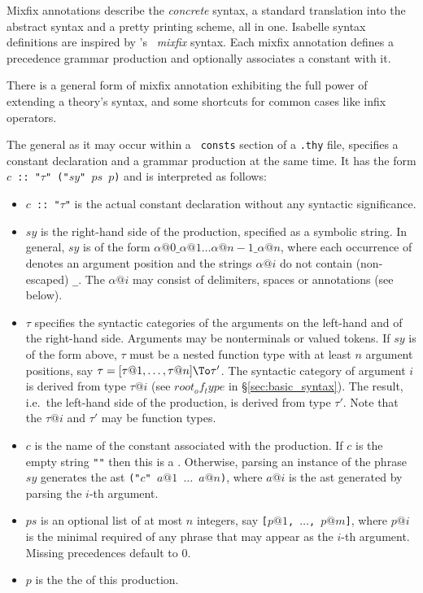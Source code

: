 Mixfix annotations describe the {\em concrete} syntax, a standard translation
into the abstract syntax and a pretty printing scheme, all in one. Isabelle
syntax definitions are inspired by \OBJ's~\cite{OBJ} {\em mixfix\/} syntax.
Each mixfix annotation defines a precedence grammar production and optionally
associates a constant with it.

There is a general form of mixfix annotation exhibiting the full power of
extending a theory's syntax, and some shortcuts for common cases like infix
operators.

The general  as it may occur within a {\tt
consts} section of a {\tt .thy}
file, specifies a constant declaration and a grammar production at the same
time. It has the form {\tt $c$ ::\ "$\tau$" ("$sy$" $ps$ $p$)} and is
interpreted as follows:
\begin{itemize}
  \item {\tt $c$ ::\ "$\tau$"} is the actual constant declaration without any
    syntactic significance.

  \item $sy$ is the right-hand side of the production, specified as a
    symbolic string. In general, $sy$ is of the form $\alpha@0 \_ \alpha@1
    \dots \alpha@{n-1} \_ \alpha@n$, where each occurrence of \ttindex{_}
    denotes an argument position and the strings
    $\alpha@i$ do not contain (non-escaped) {\tt _}. The $\alpha@i$ may
    consist of delimiters, 
    spaces or 
    annotations (see below).

  \item $\tau$ specifies the syntactic categories of the arguments on the
    left-hand and of the right-hand side. Arguments may be nonterminals or
    valued tokens. If $sy$ is of the form above, $\tau$ must be a nested
    function type with at least $n$ argument positions, say $\tau = [\tau@1,
    \dots, \tau@n] \To \tau'$. The syntactic category of argument $i$ is
    derived from type $\tau@i$ (see $root_of_type$ in
    \S\ref{sec:basic_syntax}). The result, i.e.\ the left-hand side of the
    production, is derived from type $\tau'$. Note that the $\tau@i$ and
    $\tau'$ may be function types.

  \item $c$ is the name of the constant associated with the production. If
    $c$ is the empty string {\tt ""} then this is a . Otherwise, parsing an instance of the phrase $sy$ generates
    the ast {\tt ("$c$" $a@1$ $\ldots$ $a@n$)}, where $a@i$ is the ast
    generated by parsing the $i$-th argument.

  \item $ps$ is an optional list of at most $n$ integers, say {\tt [$p@1$,
    $\ldots$, $p@m$]}, where $p@i$ is the minimal 
    required of any phrase that may appear as the $i$-th argument. Missing
    precedences default to $0$.

  \item $p$ is the  the of this production.
\end{itemize}

